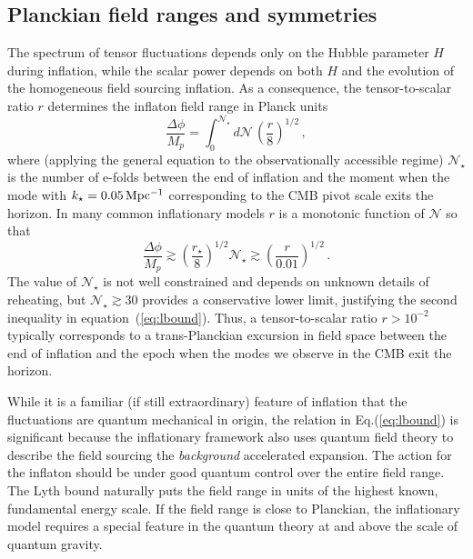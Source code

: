 \subsection{Planckian field ranges and symmetries}
The spectrum of tensor fluctuations depends only on the Hubble parameter $H$ during inflation, while the scalar power depends on both $H$ and the evolution of the homogeneous field sourcing inflation. As a consequence, the tensor-to-scalar ratio $r$ determines the inflaton field range in Planck units~\cite{Lyth:1996im}
\begin{equation}
\label{eq:Lyth}
\frac{\Delta\phi}{M_p}=\int_0^{\mathcal{N}_\star}d\mathcal{N}\,\left(\frac{r}{8}\right)^{1/2}\,,
\end{equation}
where (applying the general equation to the observationally accessible regime) $\mathcal{N}_\star$ is the number of e-folds between the end of inflation and the moment when the mode with $k_\star=0.05\,{\rm Mpc^{-1}}$ corresponding to the CMB pivot scale exits the horizon. In many common inflationary models $r$ is a monotonic function of $\mathcal{N}$ so that
\begin{equation}
\label{eq:lbound}
\frac{\Delta\phi}{M_p}\gtrsim \left(\frac{r_\star}{8}\right)^{1/2}\mathcal{N}_\star\gtrsim \left(\frac{r}{0.01}\right)^{1/2}\,.
\end{equation}  
The value of $\mathcal{N}_\star$ is not well constrained and depends on unknown details of reheating, but $\mathcal{N}_\star\gtrsim 30$ provides a conservative lower limit, justifying the second inequality in equation~(\ref{eq:lbound}). Thus, a tensor-to-scalar ratio $r>10^{-2}$ typically corresponds to a trans-Planckian excursion in field space between the end of inflation and the epoch when the modes we observe in the CMB exit the horizon.

While it is a familiar (if still extraordinary) feature of inflation that the fluctuations are quantum mechanical in origin, the relation in Eq.(\ref{eq:lbound}) is significant because the inflationary framework also uses quantum field theory to describe the field sourcing the {\it background} accelerated expansion. The action for the inflaton should be under good quantum control over the entire field range. The Lyth bound naturally puts the field range in units of the highest known, fundamental energy scale. If the field range is close to Planckian, the inflationary model requires a special feature in the quantum theory at and above the scale of quantum gravity.

